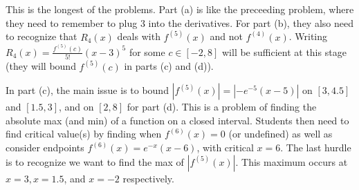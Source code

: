 \documentclass[handout]{ximera}
\begin{document}
\begin{instructorNotes}
This is the longest of the problems.  
Part (a) is like the preceeding problem, where they need to remember to plug $3$ into the derivatives.  
For part (b), they also need to recognize that $R_4(x)$ deals with $f^{(5)}(x)$ and not $f^{(4)}(x)$.  
Writing $R_4(x) = \frac{f^{(5)}(c)}{5!} (x-3)^5$ for some $c \in [-2,8]$ will be sufficient at this stage (they will bound $f^{(5)}(c)$ in parts (c) and (d)).  

In part (c), the main issue is to bound $|f^{(5)}(x)| = |-e^{-5}(x-5)|$ on $[3,4.5]$ and $[1.5,3]$, and on $[2,8]$ for part (d).  
This is a problem of finding the absolute max (and min) of a function on a closed interval.  
Students then need to find critical value(s) by finding when $f^{(6)}(x) = 0$ (or undefined) as well as consider endpoints $f^{(6)}(x) = e^{-x}(x-6)$, with critical $x=6$.  
The last hurdle is to recognize we want to find the max of $|f^{(5)}(x)|$.  
This maximum occurs at $x=3, x=1.5$, and $x=-2$ respectively.
\end{instructorNotes}
















	
	
	
	
	
	
	
	
	

	










								
				
				
	
\end{document}
